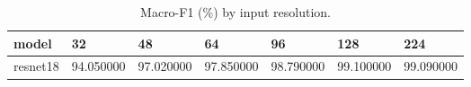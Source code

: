 \begin{table}[t]
\centering
\caption{Macro-F1 (\%) by input resolution.}
\label{tab:ablation_image_size}
\begin{tabular}{lllllll}
\toprule
model & 32 & 48 & 64 & 96 & 128 & 224 \\
\midrule
resnet18 & 94.050000 & 97.020000 & 97.850000 & 98.790000 & 99.100000 & 99.090000 \\
\bottomrule
\end{tabular}
\end{table}
